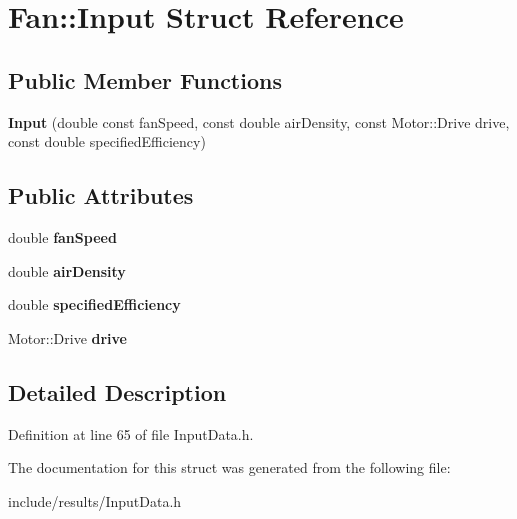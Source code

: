 \hypertarget{struct_fan_1_1_input}{}\section{Fan\+:\+:Input Struct Reference}
\label{struct_fan_1_1_input}
\subsection*{Public Member Functions}
\begin{DoxyCompactItemize}
\item 
\mbox{\label{struct_fan_1_1_input_a50887956beaf366f18a34393f41f7157}} 
{\bfseries Input} (double const fan\+Speed, const double air\+Density, const Motor\+::\+Drive drive, const double specified\+Efficiency)
\end{DoxyCompactItemize}
\subsection*{Public Attributes}
\begin{DoxyCompactItemize}
\item 
\mbox{\label{struct_fan_1_1_input_aa31350b310c1b98f107d58ba365378d8}} 
double {\bfseries fan\+Speed}
\item 
\mbox{\label{struct_fan_1_1_input_a2a62a82803563bbc967bdba928cb60fc}} 
double {\bfseries air\+Density}
\item 
\mbox{\label{struct_fan_1_1_input_a378d6eb10478d4ce7dff657b3e526a3a}} 
double {\bfseries specified\+Efficiency}
\item 
\mbox{\label{struct_fan_1_1_input_a16334966d72198d8b3ede5d222480fc0}} 
Motor\+::\+Drive {\bfseries drive}
\end{DoxyCompactItemize}


\subsection{Detailed Description}


Definition at line 65 of file Input\+Data.\+h.



The documentation for this struct was generated from the following file\+:\begin{DoxyCompactItemize}
\item 
include/results/Input\+Data.\+h\end{DoxyCompactItemize}
